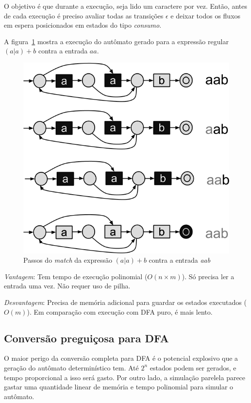 \documentclass[a4paper,12pt,oneside,onecolumn]{uerj}
\begin{document}
O objetivo é que durante a execução, seja lido um caractere por vez. Então, antes de cada execução é preciso avaliar todas as transições $\epsilon$ e deixar todos os fluxos em espera posicionados em estados do tipo \emph{consumo}.

A figura~\ref{fig:nfa_simultaneo} mostra a execução do autômato gerado para a expressão regular $(a|a)+b$ contra a entrada $aa$.

\begin{figure}[ht]
  \centering
  \includegraphics[scale=0.5]{figures/nfa_simultaneo.png}
  \caption{Passos do \emph{match} da expressão $(a|a)+b$ contra a entrada \emph{aab}}
  \label{fig:nfa_simultaneo}
\end{figure}

\emph{Vantagem}: Tem tempo de execução polinomial ($O(n \times m)$). Só precisa ler a entrada uma vez. Não requer uso de pilha.

\emph{Desvantagem}: Precisa de memória adicional para guardar os estados executados ($O(m)$). Em comparação com execução com DFA puro, é mais lento.

\subsection{Conversão preguiçosa para DFA}

O maior perigo da conversão completa para DFA é o potencial explosivo que a geração do autômato determinístico tem. Até $2^n$ estados podem ser gerados, e tempo proporcional a isso será gasto. Por outro lado, a simulação parelela parece gastar uma quantidade linear de memória e tempo polinomial para simular o autômato.
\end{document}
